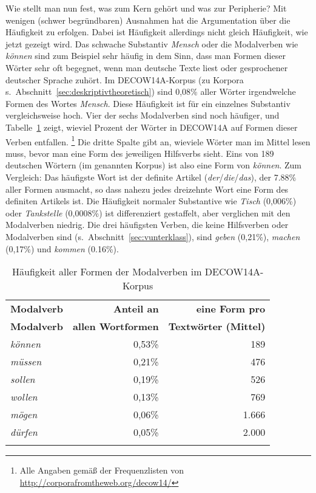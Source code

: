 Wie stellt man nun fest, was zum Kern gehört und was zur Peripherie?
Mit wenigen (schwer begründbaren) Ausnahmen hat die Argumentation über die Häufigkeit zu erfolgen.
Dabei ist Häufigkeit allerdings nicht gleich Häufigkeit, wie jetzt gezeigt wird.
Das schwache Substantiv \textit{Mensch} oder die Modalverben wie \textit{können} sind zum Beispiel sehr häufig in dem Sinn, dass man Formen dieser Wörter sehr oft begegnet, wenn man deutsche Texte liest oder gesprochener deutscher Sprache zuhört.
Im DECOW14A-Korpus (zu Korpora s.\ Abschnitt~\ref{sec:deskriptivtheoretisch}) sind 0,08\% aller Wörter irgendwelche Formen des Wortes \textit{Mensch}.
Diese Häufigkeit ist für ein einzelnes Substantiv vergleichsweise hoch. 
Vier der sechs Modalverben sind noch häufiger, und Tabelle~\ref{tab:modvfreq} zeigt, wieviel Prozent der Wörter in DECOW14A auf Formen dieser Verben entfallen.%
\footnote{Alle Angaben gemäß der Frequenzlisten von \url{http://corporafromtheweb.org/decow14/}}
Die dritte Spalte gibt an, wieviele Wörter man im Mittel lesen muss, bevor man eine Form des jeweiligen Hilfsverbs sieht.
Eins von 189 deutschen Wörtern (im genannten Korpus) ist also eine Form von \textit{können}.
Zum Vergleich: Das häufigste Wort ist der definite Artikel (\textit{der}\slash\textit{die}\slash\textit{das}), der 7.88\% aller Formen ausmacht, so dass nahezu jedes dreizehnte Wort eine Form des definiten Artikels ist.
Die Häufigkeit normaler Substantive wie \textit{Tisch} (0,006\%) oder \textit{Tankstelle} (0,0008\%) ist differenziert gestaffelt, aber verglichen mit den Modalverben niedrig.
Die drei häufigsten Verben, die keine Hilfsverben oder Modalverben sind (s.\ Abschnitt~\ref{sec:vunterklass}), sind \textit{geben} (0,21\%), \textit{machen} (0,17\%) und \textit{kommen} (0.16\%).

\begin{table}
	\begin{tabular}{lrr}
	  \lsptoprule
	  \textbf{Modalverb} & \textbf{Anteil an} & \textbf{eine Form pro}\\
	  \textbf{Modalverb} & \textbf{allen Wortformen} & \textbf{Textwörter (Mittel)}\\
	  \midrule
	  \textit{können} & 0,53\% &   189 \\
	  \textit{müssen} & 0,21\% &   476 \\
	  \textit{sollen} & 0,19\% &   526 \\
	  \textit{wollen} & 0,13\% &   769 \\
	  \textit{mögen}  & 0,06\% & 1.666\\
	  \textit{dürfen} & 0,05\% & 2.000\\
	  \lspbottomrule
	\end{tabular}
	\label{tab:modvfreq}
	\caption{Häufigkeit aller Formen der Modalverben im DECOW14A-Korpus}
\end{table}


